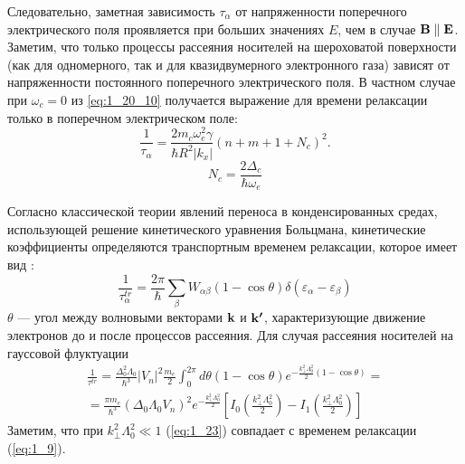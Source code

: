 Следовательно, заметная зависимость $\tau_\alpha$ от напряженности поперечного электрического поля проявляется при больших значениях $E$, чем в случае $\boldsymbol{\mathbf{B}}\parallel \boldsymbol{\mathbf{E}}$. Заметим, что только процессы рассеяния носителей на шероховатой поверхности (как для одномерного, так и для квазидвумерного электронного газа) зависят от напряженности постоянного поперечного электрического поля.
В частном случае при $\omega_c = 0$ из \eqref{eq:1_20_10} получается выражение для времени релаксации только в поперечном электрическом поле: 
\begin{equation} \label{eq:42_50}
\frac{1}{\tau _{\alpha } } =\frac{2m_c \omega_e^2 \gamma }{\hbar R^2 \left|k_x \right|} \left(n+m+1+N_c \right)^2.
\end{equation}
\[
N_c = \frac{2\Delta_c}{\hbar\omega_e}
\]

Согласно классической теории явлений переноса в конденсированных средах, использующей решение кинетического уравнения Больцмана, кинетические коэффициенты определяются транспортным временем релаксации, которое имеет вид \cite{Bonch1977}:
\begin{equation}\label{eq:1_22}
\frac{1}{\tau^{tr}_\alpha}=\frac{2\pi}{\hbar }\sum_\beta{W_{\alpha\beta}(1-\cos\theta) \delta\left(\varepsilon_\alpha-\varepsilon_\beta\right)}
\end{equation}
$\theta$ --– угол между волновыми векторами $\boldsymbol{\mathbf{k}}$ и $\boldsymbol{\mathbf{k'}}$, характеризующие движение электронов до и после процессов рассеяния. Для случая рассеяния носителей на гауссовой флуктуации
\begin{multline}\label{eq:1_23}
\frac{1}{\tau^{tr}}= \frac{\Delta^2_0\Lambda_0}{\hbar^3} \left|V_n\right|^2\frac{m_e}{2} \int^{2\pi}_0{d\theta(1-\cos\theta) e^{-\frac{k^2_\bot\Lambda^2_0}{2}(1-\cos\theta)}} = \\
= \frac{\pi m_e}{\hbar^3}\left(\Delta_0\Lambda_0 V_n\right)^2 e^{-\frac{k^2_\bot\Lambda^2_0}{2}} \left[I_0\left(\frac{k^2_\bot\Lambda^2_0}{2}\right)-I_1\left(\frac{k^2_\bot\Lambda^2_0}{2}\right)\right]
\end{multline}
Заметим, что при $k^2_\bot\Lambda^2_0 \ll 1$ (\ref{eq:1_23}) совпадает с временем релаксации (\ref{eq:1_9}).

